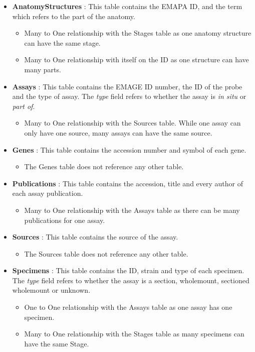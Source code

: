 \newpage
\begin{itemize}
\item \textbf{AnatomyStructures} : This table contains the EMAPA ID, and the term which refers to the part of the anatomy.
\begin{itemize}
\item Many to One relationship with the Stages table as one anatomy structure can have the same stage.
\item Many to One relationship with itself on the ID as one structure can have many parts.
\end{itemize} 

\item \textbf{Assays} : This table contains the EMAGE ID number, the ID of the probe and the type of assay. The \textit{type} field refers to whether the assay is \textit{in situ} or \textit{part of}.
\begin{itemize}
\item Many to One relationship with the Sources table. While one assay can only have one source, many assays can have the same source.
\end{itemize} 

\item \textbf{Genes} : This table contains the accession number and symbol of each gene.
\begin{itemize}
\item The Genes table does not reference any other table.
\end{itemize} 

\item \textbf{Publications} : This table contains the accession, title and every author of each assay publication.
\begin{itemize}
\item Many to One relationship with the Assays table as there can be many publications for one assay.
\end{itemize} 

\item \textbf{Sources} : This table contains the source of the assay.
\begin{itemize}
\item The Sources table does not reference any other table.
\end{itemize} 

\item \textbf{Specimens} :  This table contains the ID, strain and type of each specimen. The \textit{type} field refers to whether the assay is a section, wholemount, sectioned wholemount or unknown.
\begin{itemize}
\item One to One relationship with the Assays table as one assay has one specimen.
\item Many to One relationship with the Stages table as many specimens can have the same Stage.
\end{itemize} 


\end{itemize}
